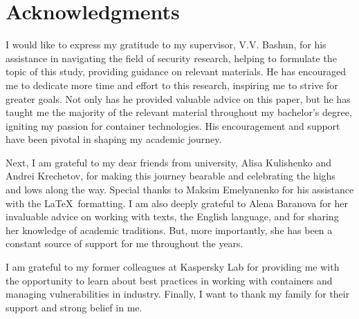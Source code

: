 \newpage
\section*{Acknowledgments}

I would like to express my gratitude to my supervisor, V.V. Bashun, for his assistance in navigating the field of security research, helping to formulate the topic of this study, providing guidance on relevant materials. He has encouraged me to dedicate more time and effort to this research, inspiring me to strive for greater goals. Not only has he provided valuable advice on this paper, but he has taught me the majority of the relevant material throughout my bachelor's degree, igniting my passion for container technologies. His encouragement and support have been pivotal in shaping my academic journey.

Next, I am grateful to my dear friends from university, Alisa Kulishenko and Andrei Krechetov, for making this journey bearable and celebrating the highs and lows along the way. Special thanks to Maksim Emelyanenko for his assistance with the \LaTeX \ formatting. I am also deeply grateful to Alena Baranova for her invaluable advice on working with texts, the English language, and for sharing her knowledge of academic traditions. But, more importantly, she has been a constant source of support for me throughout the years.

I am grateful to my former colleagues at Kaspersky Lab for providing me with the opportunity to learn about best practices in working with containers and managing vulnerabilities in industry. Finally, I want to thank my family for their support and strong belief in me.


\pagebreak